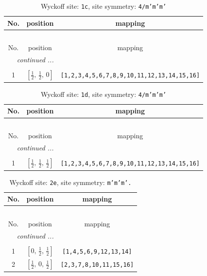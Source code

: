 \documentclass[fleqn,8pt]{jsarticle}
\begin{document}
\begin{longtable}{ccc}
\caption{Wyckoff site: {\tt 1c}, site symmetry: {\tt 4/m'm'm'}}
 \\
 \hline \hline
No. & position & mapping \\ \hline \endfirsthead

\multicolumn{2}{l}{\tablename\ \thetable{}} \\
 \hline \hline
No. & position & mapping \\ \hline \endhead

 \hline \hline
\multicolumn{2}{r}{\footnotesize\it continued ...} \\ \endfoot

 \hline \hline
\multicolumn{2}{r}{} \\ \endlastfoot

1 & $\left[ \frac{1}{2},\, \frac{1}{2},\, 0 \right]$ & {\tt [1,2,3,4,5,6,7,8,9,10,11,12,13,14,15,16]} \\
\end{longtable}
\renewcommand{\arraystretch}{1.2}
\begin{longtable}{ccc}
\caption{Wyckoff site: {\tt 1d}, site symmetry: {\tt 4/m'm'm'}}
 \\
 \hline \hline
No. & position & mapping \\ \hline \endfirsthead

\multicolumn{2}{l}{\tablename\ \thetable{}} \\
 \hline \hline
No. & position & mapping \\ \hline \endhead

 \hline \hline
\multicolumn{2}{r}{\footnotesize\it continued ...} \\ \endfoot

 \hline \hline
\multicolumn{2}{r}{} \\ \endlastfoot

1 & $\left[ \frac{1}{2},\, \frac{1}{2},\, \frac{1}{2} \right]$ & {\tt [1,2,3,4,5,6,7,8,9,10,11,12,13,14,15,16]} \\
\end{longtable}
\renewcommand{\arraystretch}{1.2}
\begin{longtable}{ccc}
\caption{Wyckoff site: {\tt 2e}, site symmetry: {\tt m'm'm'.}}
 \\
 \hline \hline
No. & position & mapping \\ \hline \endfirsthead

\multicolumn{2}{l}{\tablename\ \thetable{}} \\
 \hline \hline
No. & position & mapping \\ \hline \endhead

 \hline \hline
\multicolumn{2}{r}{\footnotesize\it continued ...} \\ \endfoot

 \hline \hline
\multicolumn{2}{r}{} \\ \endlastfoot

1 & $\left[ 0,\, \frac{1}{2},\, \frac{1}{2} \right]$ & {\tt [1,4,5,6,9,12,13,14]} \\ \hline
2 & $\left[ \frac{1}{2},\, 0,\, \frac{1}{2} \right]$ & {\tt [2,3,7,8,10,11,15,16]} \\
\end{longtable}
\end{document}
